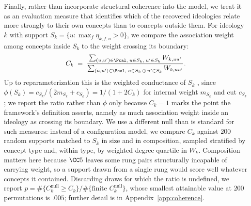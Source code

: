 Finally, rather than incorporate structural coherence into the model, we treat it as an
evaluation measure that identifies which of the recovered ideologies relate more strongly
to their own concepts than to concepts outside them. For ideology $k$ with support
$S_k=\{u:\max_f\eta_{k,f,u}>0\}$, we compare the association weight among concepts inside
$S_k$ to the weight crossing its boundary:
\[
  C_k \;=\;
  \frac{\sum_{(u,u')\in\Pcal,\; u\in S_k,\; u'\in S_k} W_{k,uu'}}
       {\sum_{(u,u')\in\Pcal,\; u\in S_k \,\oplus\, u'\in S_k} W_{k,uu'}}.
\]
Up to reparameterization this is the weighted conductance of $S_k$
\citep{shi2000,kannan2004}, since $\phi(S_k)=c_{S_k}/(2m_{S_k}+c_{S_k})=1/(1+2C_k)$ for
internal weight $m_{S_k}$ and cut $c_{S_k}$; we report the ratio rather than $\phi$ only
because $C_k=1$ marks the point the framework's definition asserts, namely as much
association weight inside an ideology as crossing its boundary. We use a different null
than is standard for such measures: instead of a configuration model, we compare $C_k$
against $200$ random supports matched to $S_k$ in size and in composition, sampled
stratified by concept type and, within type, by weighted-degree quartile in $W_k$.
Composition matters here because $\CC5$ leaves some rung pairs structurally incapable of
carrying weight, so a support drawn from a single rung would score well whatever concepts
it contained. Discarding draws for which the ratio is undefined, we report
$p=\#\{C_k^{\text{null}}\ge C_k\}/\#\{\text{finite }C_k^{\text{null}}\}$, whose smallest
attainable value at $200$ permutations is $.005$; further detail is in
Appendix~\ref{app:coherence}.
